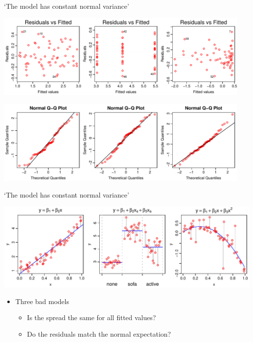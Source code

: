 \documentclass[xcolor=x11names,compress]{beamer}
\renewcommand{\(}{\begin{columns}}
\renewcommand{\)}{\end{columns}}
\newcommand{\<}[1]{\begin{column}{#1}}
\renewcommand{\>}{\end{column}}
\begin{document}

\begin{frame}{`The model has constant normal variance'}

\includegraphics[width=0.95\textwidth]{FitResid.pdf}

\includegraphics[width=0.95\textwidth]{QQNorm.pdf}

\end{frame}


\begin{frame}{`The model has constant normal variance'}

\includegraphics[width=\textwidth]{NonConstantVarianceMods.pdf}

\begin{itemize}
\item Three bad models
\begin{itemize}
\item Is the spread the same for all fitted values?
\item Do the residuals match the normal expectation?
\end{itemize}
\end{itemize}

\end{frame}
\end{document}
